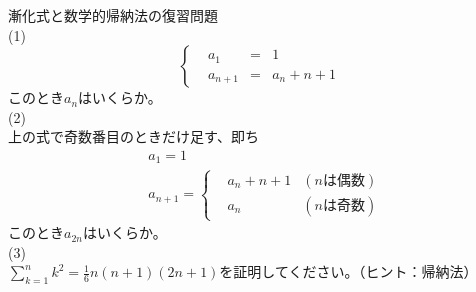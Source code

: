 \documentclass[12pt,a4paper]{jsarticle}
\begin{document}
漸化式と数学的帰納法の復習問題\\
(1)\\
\begin{equation*}
    \left\{
      \begin{aligned}
      &a_1 &=&1  \\
      &a_{n+1} &=&a_n+n+1
      \end{aligned}
    \right.
\end{equation*}
このとき$a_n$はいくらか。\\
(2)\\
上の式で奇数番目のときだけ足す、即ち
\begin{equation*}
    \begin{split}
        &a_1=1\\
        &a_{n+1}=
        \left\{
        \begin{aligned}
            &a_n+n+1 &(nは偶数)\\
            &a_n &(nは奇数)
        \end{aligned}
        \right.
    \end{split}
\end{equation*}
このとき$a_{2n}$はいくらか。\\
(3)\\
$\sum_{k=1}^{n}k^2=\frac{1}{6}n(n+1)(2n+1)$を証明してください。（ヒント：帰納法）
\end{document}
